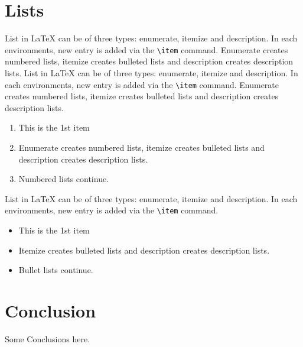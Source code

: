 \documentclass{CUP-JNL-DCE}
\begin{document}
\vspace*{-5pt}
\section{Lists}

List in \LaTeX{} can be of three types: enumerate, itemize and description.
In each environments, new entry is added via the \verb+\item+ command.
Enumerate creates numbered lists, itemize creates bulleted lists and
description creates description lists.
List in \LaTeX{} can be of three types: enumerate, itemize and description.
In each environments, new entry is added via the \verb+\item+ command.
Enumerate creates numbered lists, itemize creates bulleted lists and
description creates description lists.
\begin{enumerate}[1.]
\item This is the 1st item
\item Enumerate creates numbered lists, itemize creates bulleted lists and
description creates description lists.
\item Numbered lists continue.
\end{enumerate}
List in \LaTeX{} can be of three types: enumerate, itemize and description.
In each environments, new entry is added via the \verb+\item+ command.
\begin{itemize}
\item This is the 1st item
\item Itemize creates bulleted lists and
description creates description lists.
\item Bullet lists continue.
\end{itemize}

\vspace*{-12pt}
\section{Conclusion}

Some Conclusions here.
\end{document}
